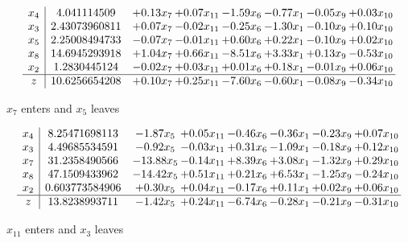 \documentclass[8pt]{article}
\begin{document}
 \[\begin{array}{c| c c@{\hskip 2pt} c@{\hskip 2pt} c@{\hskip 2pt} c@{\hskip 2pt} c@{\hskip 2pt} c@{\hskip 2pt} }
 x_{4}   &  4.041114509 & +  0.13 x_{7} & +  0.07 x_{11} & -1.59 x_{6} & -0.77 x_{1} & -0.05 x_{9} & +  0.03 x_{10}\\
 x_{3}   &  2.43073960811 & +  0.07 x_{7} & -0.02 x_{11} & -0.25 x_{6} & -1.30 x_{1} & -0.10 x_{9} & +  0.10 x_{10}\\
 x_{5}   &  2.25008494733 & -0.07 x_{7} & -0.01 x_{11} & +  0.60 x_{6} & +  0.22 x_{1} & -0.10 x_{9} & +  0.02 x_{10}\\
 x_{8}   &  14.6945293918 & +  1.04 x_{7} & +  0.66 x_{11} & -8.51 x_{6} & +  3.33 x_{1} & +  0.13 x_{9} & -0.53 x_{10}\\
 x_{2}   &  1.2830445124 & -0.02 x_{7} & +  0.03 x_{11} & +  0.01 x_{6} & +  0.18 x_{1} & -0.01 x_{9} & +  0.06 x_{10}\\
\hline
z    &  10.6256654208 & +  0.10 x_{7} & +  0.25 x_{11} & -7.60 x_{6} & -0.60 x_{1} & -0.08 x_{9} & -0.34 x_{10}\\
\end{array}\]


 $ x_{7} $ enters and $ x_{5} $ leaves 

 \[\begin{array}{c| c c@{\hskip 2pt} c@{\hskip 2pt} c@{\hskip 2pt} c@{\hskip 2pt} c@{\hskip 2pt} c@{\hskip 2pt} }
 x_{4}   &  8.25471698113 & -1.87 x_{5} & +  0.05 x_{11} & -0.46 x_{6} & -0.36 x_{1} & -0.23 x_{9} & +  0.07 x_{10}\\
 x_{3}   &  4.49685534591 & -0.92 x_{5} & -0.03 x_{11} & +  0.31 x_{6} & -1.09 x_{1} & -0.18 x_{9} & +  0.12 x_{10}\\
 x_{7}   &  31.2358490566 & -13.88 x_{5} & -0.14 x_{11} & +  8.39 x_{6} & +  3.08 x_{1} & -1.32 x_{9} & +  0.29 x_{10}\\
 x_{8}   &  47.1509433962 & -14.42 x_{5} & +  0.51 x_{11} & +  0.21 x_{6} & +  6.53 x_{1} & -1.25 x_{9} & -0.24 x_{10}\\
 x_{2}   &  0.603773584906 & +  0.30 x_{5} & +  0.04 x_{11} & -0.17 x_{6} & +  0.11 x_{1} & +  0.02 x_{9} & +  0.06 x_{10}\\
\hline
z    &  13.8238993711 & -1.42 x_{5} & +  0.24 x_{11} & -6.74 x_{6} & -0.28 x_{1} & -0.21 x_{9} & -0.31 x_{10}\\
\end{array}\]


 $ x_{11} $ enters and $ x_{3} $ leaves 
\end{document}
